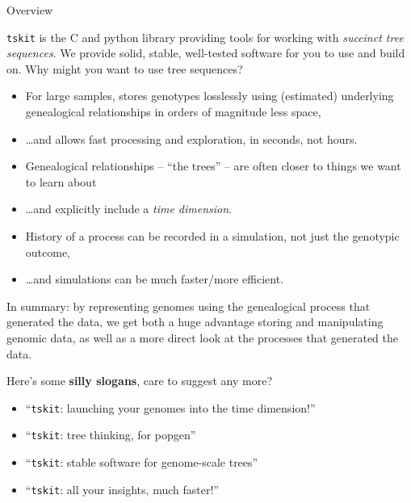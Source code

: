 \documentclass[landscape,a0paper,fontscale=0.4]{baposter}
\newcommand{\tskit}{{\texttt{tskit}}}
\newcommand{\compresslist}{%
 \setlength{\itemsep}{1pt}%
 \setlength{\parskip}{0pt}%
 \setlength{\parsep}{0pt}%
 }
\begin{document}
\begin{poster}
\begin{posterbox}[name=overview,column=1,row=0,span=2]{Overview}

\begin{multicols}{2}

\tskit{} is the C and python library providing tools for working with \emph{succinct tree sequences}.
We provide solid, stable, well-tested software for you to use and build on.
Why might you want to use tree sequences?
\begin{itemize} \compresslist
    \item For large samples,
        stores genotypes losslessly using (estimated) underlying genealogical relationships
        in orders of magnitude less space,
    \item \ldots and allows fast processing and exploration, in seconds, not hours.
    \item Genealogical relationships -- ``the trees'' -- are often closer to
        things we want to learn about
    \item \ldots and explicitly include a \emph{time dimension}.
    \item History of a process can be recorded in a simulation, not just the genotypic outcome,
    \item \ldots and simulations can be much faster/more efficient.
\end{itemize}

In summary:
by representing genomes using the genealogical process that generated the data,
we get both a huge advantage storing and manipulating genomic data,
as well as a more direct look at the processes that generated the data.

    \vspace{2em}

Here's some \textbf{silly slogans}, care to suggest any more?
\begin{itemize} \compresslist
    \item ``\tskit: launching your genomes into the time dimension!''
    \item ``\tskit: tree thinking, for popgen''
    \item ``\tskit: stable software for genome-scale trees''
    \item ``\tskit: all your insights, much faster!''
\end{itemize}


\end{multicols}
\end{posterbox}
\end{poster}
\end{document}
